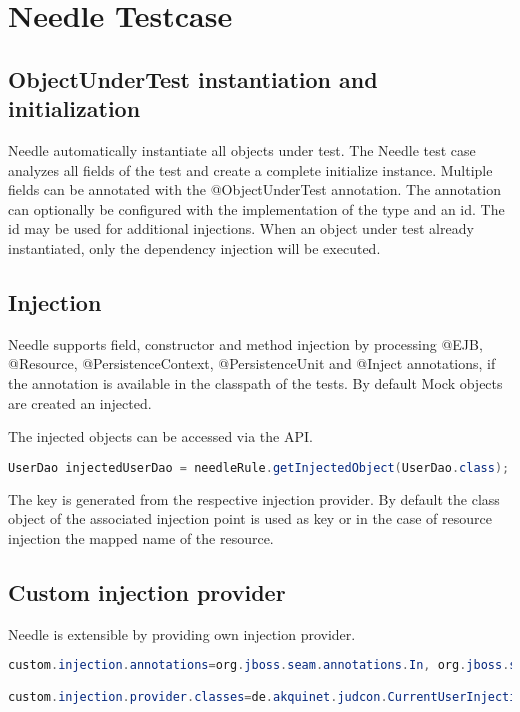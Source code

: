 \chapter{Needle Testcase}

\section{ObjectUnderTest instantiation and initialization}
\label{sec: ObjectUnderTest}

Needle automatically instantiate all objects under test. The Needle test case analyzes all fields of the test and create a complete initialize instance.
Multiple fields can be annotated with the @ObjectUnderTest annotation. The annotation can optionally be configured with the implementation of the type and an id.
The id may be used for additional injections. When an object under test already instantiated, only the dependency injection will be executed.


\section{Injection}
\label{sec:Injection}

Needle supports field, constructor and method injection by processing @EJB, @Resource, @PersistenceContext, @PersistenceUnit
and @Inject annotations, if the annotation is available in the classpath of the tests. By default Mock objects are created an injected.

The injected objects can be accessed via the API.

\begin{lstlisting}[language={JAVA},caption=Injected Components]
UserDao injectedUserDao = needleRule.getInjectedObject(UserDao.class);
\end{lstlisting}

The key is generated from the respective injection provider. By default the class object of the associated injection point is used as key or in the case of resource injection the mapped name of the resource.


\section{Custom injection provider}
\label{sec:Custom injection provider}

Needle is extensible by providing own injection provider.

\begin{lstlisting}[language={JAVA},caption=Global Injection Prvider]
custom.injection.annotations=org.jboss.seam.annotations.In, org.jboss.seam.annotations.Logger

custom.injection.provider.classes=de.akquinet.judcon.CurrentUserInjectionProvider

\end{lstlisting}

